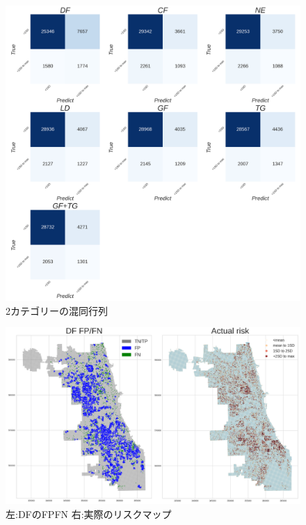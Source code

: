 \begin{figure}
  \centering %
  \includegraphics[scale=0.16]{./non-crime-no-timeseries-fig/non_crime_no_timeseries_two_cm.png}
  \caption{2カテゴリーの混同行列}
  \label{fig:non-crime-no-timeseries-2cm}
\end{figure}
\begin{figure}
  \centering %
  \includegraphics[scale=0.25]{./non-crime-no-timeseries-fig/DF_fnp.png}
  \caption{左:DFのFPFN 右:実際のリスクマップ}
  \label{fig:non-crime-no-timeseries-df-fnp}
\end{figure}

